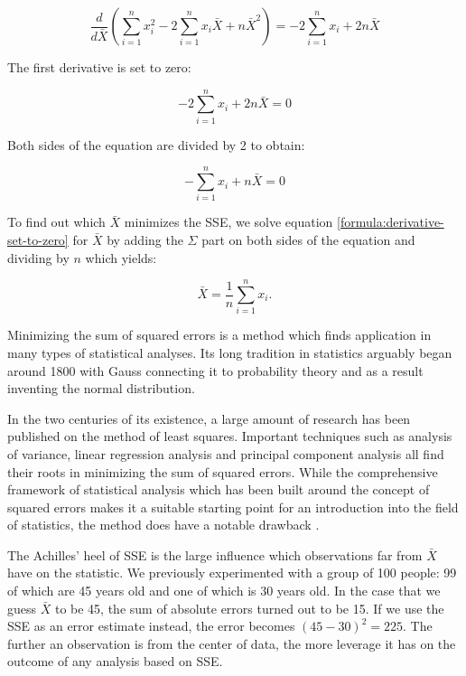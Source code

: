 \documentclass{tufte-book} %
\begin{document}
\begin{equation}
\frac{d}{d\bar{X}} \left(\sum_{i=1}^n x_i^2 - 2\sum_{i=1}^nx_i\bar{X} + n\bar{X}^2\right) =
- 2\sum_{i=1}^nx_i + 2n\bar{X}
\end{equation}

The first derivative is set to zero:

\begin{equation}
- 2\sum_{i=1}^nx_i + 2n\bar{X} = 0
\end{equation}

Both sides of the equation are divided by 2 to obtain:

\begin{equation}
-\sum_{i=1}^nx_i + n\bar{X} = 0
\label{formula:derivative-set-to-zero}
\end{equation}

To find out which $\bar{X}$ minimizes the SSE, we solve equation \ref{formula:derivative-set-to-zero} for $\bar{X}$ by adding the $\Sigma$ part on both sides of the equation and dividing by $n$ which yields:

\begin{equation}
\bar{X} = \frac{1}{n}\sum_{i=1}^nx_i.
\end{equation}

\begin{tcolorbox}
Minimizing the sum of squared errors is a method which finds application in many types of statistical analyses. Its long tradition in statistics arguably began around 1800 with Gauss connecting it to probability theory and as a result inventing the normal distribution.
\end{tcolorbox}

In the two centuries of its existence, a large amount of research has been published on the method of least squares. Important techniques such as analysis of variance, linear regression analysis and principal component analysis all find their roots in minimizing the sum of squared errors. While the comprehensive framework of statistical analysis which has been built around the concept of squared errors makes it a suitable starting point for an introduction into the field of statistics, the method does have a notable drawback \cite{Abdi2007}.

The Achilles' heel of SSE is the large influence which observations far from $\bar{X}$ have on the statistic. We previously experimented with a group of 100 people: 99 of which are 45 years old and one of which is 30 years old. In the case that we guess $\bar{X}$ to be 45, the sum of absolute errors turned out to be 15. If we use the SSE as an error estimate instead, the error becomes $(45 - 30) ^2 = 225$. The further an observation is from the center of data, the more leverage it has on the outcome of any analysis based on SSE.
\end{document}
